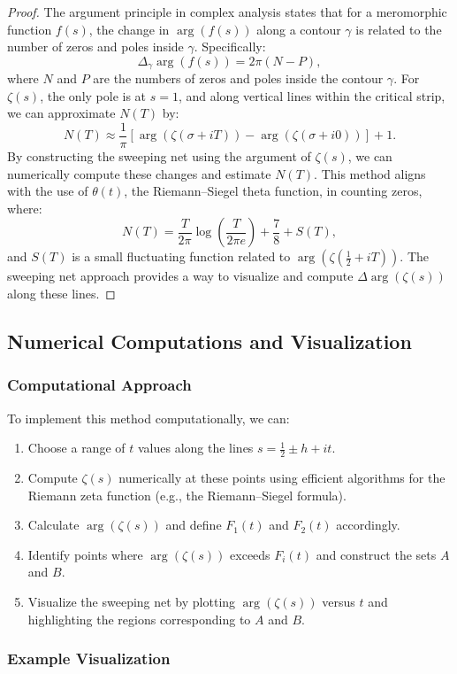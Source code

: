 \documentclass{article}
\begin{document}
\begin{proof}
The argument principle in complex analysis states that for a meromorphic function $f(s)$, the change in $\arg(f(s))$ along a contour $\gamma$ is related to the number of zeros and poles inside $\gamma$. Specifically: \[
\Delta_{\gamma} \arg(f(s)) = 2\pi (N - P),
\] where $N$ and $P$ are the numbers of zeros and poles inside the contour $\gamma$. For $\zeta(s)$, the only pole is at $s = 1$, and along vertical lines within the critical strip, we can approximate $N(T)$ by: \[
N(T) \approx \frac{1}{\pi} \left[ \arg(\zeta(\sigma + iT)) - \arg(\zeta(\sigma + i0)) \right] + 1.
\] By constructing the sweeping net using the argument of $\zeta(s)$, we can numerically compute these changes and estimate $N(T)$. This method aligns with the use of $\theta(t)$, the Riemann–Siegel theta function, in counting zeros, where: \[
N(T) = \frac{T}{2\pi} \log\left( \frac{T}{2\pi e} \right) + \frac{7}{8} + S(T),
\] and $S(T)$ is a small fluctuating function related to $\arg(\zeta(\tfrac{1}{2} + iT))$. The sweeping net approach provides a way to visualize and compute $\Delta \arg(\zeta(s))$ along these lines.
\end{proof} \subsection{Numerical Computations and Visualization} \subsubsection{Computational Approach} To implement this method computationally, we can: \begin{enumerate} \item Choose a range of $t$ values along the lines $s = \tfrac{1}{2} \pm h + it$. \item Compute $\zeta(s)$ numerically at these points using efficient algorithms for the Riemann zeta function (e.g., the Riemann–Siegel formula). \item Calculate $\arg(\zeta(s))$ and define $F_1(t)$ and $F_2(t)$ accordingly. \item Identify points where $\arg(\zeta(s))$ exceeds $F_i(t)$ and construct the sets $A$ and $B$. \item Visualize the sweeping net by plotting $\arg(\zeta(s))$ versus $t$ and highlighting the regions corresponding to $A$ and $B$.
\end{enumerate} \subsubsection{Example Visualization} \begin{figure}[h!]

\end{figure}
\end{document}
